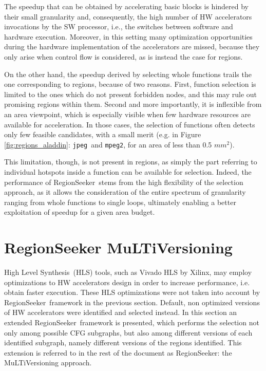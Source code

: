 \documentclass[]{usiinfthesis}
\newcommand{\rseeker}{{RegionSeeker}}
\newcommand{\HLS}{{High Level Synthesis}}
\newcommand{\jpeg}{\texttt{jpeg}}
\newcommand{\mpeg}{\texttt{mpeg2}}
\begin{document}
The speedup that can be obtained by accelerating basic blocks is
hindered by their small granularity and, consequently, the high number
of HW accelerators invocations by the SW processor, i.e., the switches 
between software and hardware execution. Moreover, in this
setting many optimization opportunities
during the hardware implementation of the accelerators are missed,
because they only arise when control flow is considered, as is instead the case
for regions.\par

On the other hand, the speedup derived by selecting whole functions
trails the one corresponding to regions, because of two
reasons. First, function selection is limited to the ones which do not
present forbidden nodes, and this may rule out promising regions
within them. Second and more importantly, it is inflexible from
an area viewpoint, which is especially visible when few hardware
resources are available for acceleration. In those cases, the
selection of functions often detects only few feasible candidates,
with a small merit (e.g. in Figure \ref{fig:regions_aladdin}: \jpeg\ and 
\mpeg, for an area of less than 0.5 $mm^2$).\par

This limitation, though, is not present in regions, as simply the part
referring to individual hotspots inside a function can be available
for selection. Indeed, the performance of \rseeker\ stems from the high
flexibility of the selection approach, as it allows the consideration of
the entire spectrum of granularity ranging from whole functions to
single loops, ultimately enabling a better exploitation of speedup for
a given area budget.


\newpage
\section{RegionSeeker MuLTiVersioning}

\HLS\ (HLS) tools, such as Vivado HLS by Xilinx, may employ %
optimizations to HW accelerators
design in order to increase performance, i.e. obtain faster execution. These 
HLS optimizations were not taken into account by \rseeker\ framework in the
previous section. Default, non optimized versions of HW accelerators were identified
and selected instead. In this
section an extended \rseeker\ framework is presented, which performs the selection not 
only among possible CFG subgraphs, but also among different versions of each identified 
subgraph, namely different versions of the regions identified. 
This extension is referred to in the rest of the document as RegionSeeker: the 
MuLTiVersioning approach.
\end{document}
